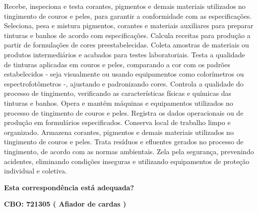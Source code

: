 \documentclass[
]{article}
\begin{document}
Recebe, inspeciona e testa corantes, pigmentos e demais materiais
utilizados no tingimento de couros e peles, para garantir a conformidade
com as especificações. Seleciona, pesa e mistura pigmentos, corantes e
materiais auxiliares para preparar tinturas e banhos de acordo com
especificações. Calcula receitas para produção a partir de formulações
de cores preestabelecidas. Coleta amostras de materiais ou produtos
intermediários e acabados para testes laboratoriais. Testa a qualidade
de tinturas aplicadas em couros e peles, comparando a cor com os padrões
estabelecidos - seja visualmente ou usando equipamentos como
colorímetros ou espectrofotômetros -, ajustando e padronizando cores.
Controla a qualidade do processo de tingimento, verificando as
características físicas e químicas das tinturas e banhos. Opera e mantém
máquinas e equipamentos utilizados no processo de tingimento de couros e
peles. Registra os dados operacionais ou de produção em formulários
especificados. Conserva local de trabalho limpo e organizado. Armazena
corantes, pigmentos e demais materiais utilizados no tingimento de
couros e peles. Trata resíduos e efluentes gerados no processo de
tingimento, de acordo com as normas ambientais. Zela pela segurança,
prevenindo acidentes, eliminando condições inseguras e utilizando
equipamentos de proteção individual e coletiva.

\begin{Form}
\textbf{Esta correspondência está adequada?} \\ 
\end{Form}

\textbf{CBO: 721305  ( Afiador de cardas )}
\end{document}
